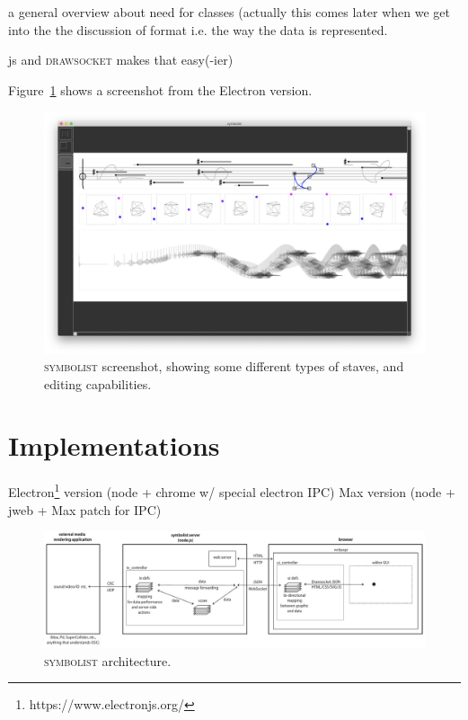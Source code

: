 \documentclass{article}
\def\symbolist{\textsc{symbolist}\xspace}
\def\drawsocket{\textsc{drawsocket}\xspace}
\begin{document}
\cite{hajdu2005quintet}

a general overview about need for classes (actually this comes later when we get into the the discussion of format i.e. the way the data is represented.

js and \drawsocket makes that easy(-ier)


Figure~\ref{fig:screenshot} shows a screenshot from the Electron version.


\begin{figure}[ht!]
\centering
\includegraphics[width=2\columnwidth]{symbolist.png}
\caption{ \symbolist screenshot, showing some different types of staves, and editing capabilities.
\label{fig:screenshot}}
\end{figure}


\section{Implementations}\label{sec:implementations}

Electron\footnote{https://www.electronjs.org/} version (node + chrome w/ special electron IPC)
Max version (node + jweb + Max patch for IPC)


\begin{figure}[ht!]
\centering
\includegraphics[width=2\columnwidth]{symbolist-architecture2.pdf}
\caption{ \symbolist architecture.
\label{fig:architecture}}
\end{figure}
\end{document}
